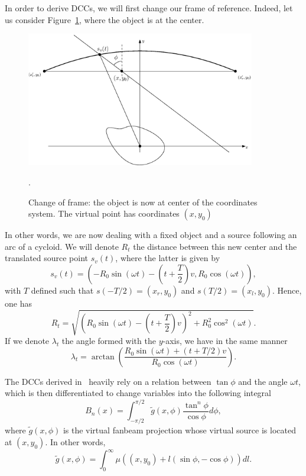 \documentclass[a4paper]{article}
\numberwithin{equation}{section}
\begin{document}
In order to derive DCCs, we will first change our frame of reference. Indeed, let us consider Figure~\ref{fig:change_frame}, where the object is at the center.
\begin{figure}[!ht]
	\centering
	\includegraphics[width=10cm]{figs/frame_object.eps}
	\caption{Change of frame: the object is now at center of the coordinates system. The virtual point has coordinates $\left( x,y_0 \right)$\label{fig:change_frame}}.
\end{figure}
In other words, we are now dealing with a fixed object and a source following an arc of a cycloid. We will denote $R_t$ the distance between this new center and the translated source point $s_v(t)$, where the latter is given by
\begin{equation}
	s_v(t) = \left( -R_0 \sin(\omega t) - \left( t + \frac{T}{2} \right)v, R_0 \cos(\omega t) \right),
\end{equation}
with $T$ defined such that $s(-T/2) = \left(x_r,y_0\right) $ and $s(T/2) = \left(x_l,y_0\right)$. Hence, one has
\begin{equation}
R_t = \sqrt{ \left( R_0 \sin(\omega t) - \left( t + \frac{T}{2} \right)v \right)^2 + R_0^2 \cos^2(\omega t) }.	
\end{equation}
If we denote $\lambda_t$ the angle formed with the $y$-axis, we have in the same manner
\begin{equation}
\lambda_t = \arctan \left( \frac{R_0 \sin(\omega t) + \left( t + T/2 \right)v}{R_0 \cos(\omega t)} \right).
\end{equation}

The DCCs derived in~\cite{clackdoyle2015consistency} heavily rely on a relation between $\tan \phi$ and the angle $\omega t$, which is then differentiated to change variables into the following integral
\begin{equation}
	B_n(x) = \int_{-\pi/2}^{\pi/2} \tilde{g}(x,\phi) \frac{\tan^n \phi}{\cos \phi} d\phi,	
	\label{eq:Bn_x_phi}
\end{equation}
where $\tilde{g}(x,\phi)$ is the virtual fanbeam projection whose virtual source is located at $(x,y_0)$. In other words,
\begin{equation}
	\tilde{g}(x,\phi) = \int_0^{\infty} \mu\left( (x,y_0) + l(\sin \phi, -\cos \phi) \right) dl.
\end{equation}
\end{document}
